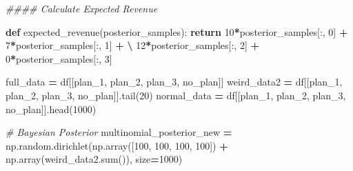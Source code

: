 \documentclass[
]{book}
\newenvironment{Shaded}{\begin{snugshade}}{\end{snugshade}}
\newcommand{\BuiltInTok}[1]{#1}
\newcommand{\CommentTok}[1]{\textcolor[rgb]{0.56,0.35,0.01}{\textit{#1}}}
\newcommand{\ControlFlowTok}[1]{\textcolor[rgb]{0.13,0.29,0.53}{\textbf{#1}}}
\newcommand{\DecValTok}[1]{\textcolor[rgb]{0.00,0.00,0.81}{#1}}
\newcommand{\KeywordTok}[1]{\textcolor[rgb]{0.13,0.29,0.53}{\textbf{#1}}}
\newcommand{\NormalTok}[1]{#1}
\newcommand{\OperatorTok}[1]{\textcolor[rgb]{0.81,0.36,0.00}{\textbf{#1}}}
\newcommand{\StringTok}[1]{\textcolor[rgb]{0.31,0.60,0.02}{#1}}
\theoremstyle{definition}
\theoremstyle{definition}
\theoremstyle{definition}
\theoremstyle{remark}
\begin{document}
\begin{Shaded}
\begin{Highlighting}[]
\CommentTok{\#\#\#\# Calculate Expected Revenue}

\KeywordTok{def}\NormalTok{ expected\_revenue(posterior\_samples):}
    \ControlFlowTok{return} \DecValTok{10}\OperatorTok{*}\NormalTok{posterior\_samples[:, }\DecValTok{0}\NormalTok{] }\OperatorTok{+} \DecValTok{7}\OperatorTok{*}\NormalTok{posterior\_samples[:, }\DecValTok{1}\NormalTok{] }\OperatorTok{+} \OperatorTok{\textbackslash{}}
           \DecValTok{12}\OperatorTok{*}\NormalTok{posterior\_samples[:, }\DecValTok{2}\NormalTok{] }\OperatorTok{+} \DecValTok{0}\OperatorTok{*}\NormalTok{posterior\_samples[:, }\DecValTok{3}\NormalTok{]}

\NormalTok{full\_data }\OperatorTok{=}\NormalTok{ df[[}\StringTok{\textquotesingle{}plan\_1\textquotesingle{}}\NormalTok{, }\StringTok{\textquotesingle{}plan\_2\textquotesingle{}}\NormalTok{, }\StringTok{\textquotesingle{}plan\_3\textquotesingle{}}\NormalTok{, }\StringTok{\textquotesingle{}no\_plan\textquotesingle{}}\NormalTok{]]}
\NormalTok{weird\_data2 }\OperatorTok{=}\NormalTok{ df[[}\StringTok{\textquotesingle{}plan\_1\textquotesingle{}}\NormalTok{, }\StringTok{\textquotesingle{}plan\_2\textquotesingle{}}\NormalTok{, }\StringTok{\textquotesingle{}plan\_3\textquotesingle{}}\NormalTok{, }\StringTok{\textquotesingle{}no\_plan\textquotesingle{}}\NormalTok{]].tail(}\DecValTok{20}\NormalTok{)}
\NormalTok{normal\_data }\OperatorTok{=}\NormalTok{ df[[}\StringTok{\textquotesingle{}plan\_1\textquotesingle{}}\NormalTok{, }\StringTok{\textquotesingle{}plan\_2\textquotesingle{}}\NormalTok{, }\StringTok{\textquotesingle{}plan\_3\textquotesingle{}}\NormalTok{, }\StringTok{\textquotesingle{}no\_plan\textquotesingle{}}\NormalTok{]].head(}\DecValTok{1000}\NormalTok{)}

\CommentTok{\# Bayesian Posterior}
\NormalTok{multinomial\_posterior\_new }\OperatorTok{=}\NormalTok{ np.random.dirichlet(np.array([}\DecValTok{100}\NormalTok{, }\DecValTok{100}\NormalTok{, }\DecValTok{100}\NormalTok{, }\DecValTok{100}\NormalTok{]) }\OperatorTok{+}\NormalTok{ np.array(weird\_data2.}\BuiltInTok{sum}\NormalTok{()), size}\OperatorTok{=}\DecValTok{1000}\NormalTok{)}


\end{Highlighting}
\end{Shaded}
\end{document}
